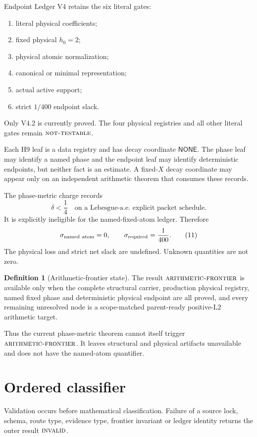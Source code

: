 \documentclass[11pt]{article}
\theoremstyle{definition}
\newtheorem{definition}[theorem]{Definition}
\theoremstyle{remark}
\newcommand{\NT}{\textnormal{\textsc{not-testable}}}
\newcommand{\AF}{\textnormal{\textsc{arithmetic-frontier}}}
\newcommand{\INVALID}{\textnormal{\textsc{invalid}}}
\newcommand{\Ltwo}{\mathrm{L2}}
\begin{document}
Endpoint Ledger V4 retains the six literal gates:
\begin{enumerate}[label=\textnormal{V4.\arabic*},leftmargin=2.8em]
\item literal physical coefficients;
\item fixed physical \(h_0=2\);
\item physical atomic normalization;
\item canonical or minimal representation;
\item actual active support;
\item strict \(1/400\) endpoint slack.
\end{enumerate}
Only V4.2 is currently proved.  The four physical registries and all
other literal gates remain \(\NT\).

Each H9 leaf is a data registry and has decay coordinate
\(\mathsf{NONE}\).  The phase leaf may identify a named phase and the
endpoint leaf may identify deterministic endpoints, but neither fact
is an estimate.  A fixed-\(X\) decay coordinate may appear only on an
independent arithmetic theorem that consumes these records.

The phase-metric charge records
\[
 \delta<\frac14
\quad\text{on a Lebesgue-a.e.\ explicit packet schedule}.
\tag{10}\label{eq:metric-delta}
\]
It is explicitly ineligible for the named-fixed-atom ledger.
Therefore
\[
 \sigma_{\rm named\ atom}=0,\qquad
 \sigma_{\rm required}=\frac1{400}.
\tag{11}\label{eq:sigmas}
\]
The physical loss and strict net slack are undefined.  Unknown
quantities are not zero.

\begin{definition}[Arithmetic-frontier state]
\label{def:AF}
The result \(\AF\) is available only when the complete structural
carrier, production physical registry, named fixed phase and
deterministic physical endpoint are all proved, and every remaining
unresolved node is a scope-matched parent-ready positive-\(\Ltwo\)
arithmetic target.
\end{definition}

Thus the current phase-metric theorem cannot itself trigger
\(\AF\).  It leaves structural and physical artifacts unavailable
and does not have the named-atom quantifier.

\section{Ordered classifier}

Validation occurs before mathematical classification.  Failure of a
source lock, schema, route type, evidence type, frontier invariant or
ledger identity returns the outer result \(\INVALID\).
\end{document}
